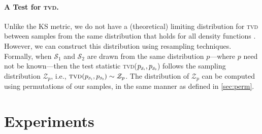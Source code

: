 \documentclass[11pt,a4paper]{article}
\newcommand{\calS}{\mathcal{S}}
\newcommand{\mathcheck}[1]{#1}
\begin{document}
\paragraph{A Test for \textsc{tvd}.}\label{sec:multinomial}
Unlike the  KS metric, we do not have a (theoretical) limiting distribution for \textsc{tvd} between samples from the same distribution that holds for all density functions \cite{tvd_not_c}. However, we can construct this distribution using resampling techniques. Formally, when $\calS_1$ and $\calS_2$ are drawn from the same distribution $p$---where $p$ need not be known---then the test statistic \textsc{tvd}($p_{\scaleto{\calS_1}{4pt}}, p_{\scaleto{\calS_2}{4pt}}$) follows the sampling distribution $\mathcal{Z}_p$, i.e., \mathcheck{$\textsc{tvd}(p_{\scaleto{\calS_1}{4pt}}, p_{\scaleto{\calS_2}{4pt}}) \sim \mathcal{Z}_p$}. The distribution of $\mathcal{Z}_p$ can be computed using permutations of our samples, in the same manner as defined in \cref{sec:perm}. 











\section{Experiments}\label{sec:exp}
\end{document}
